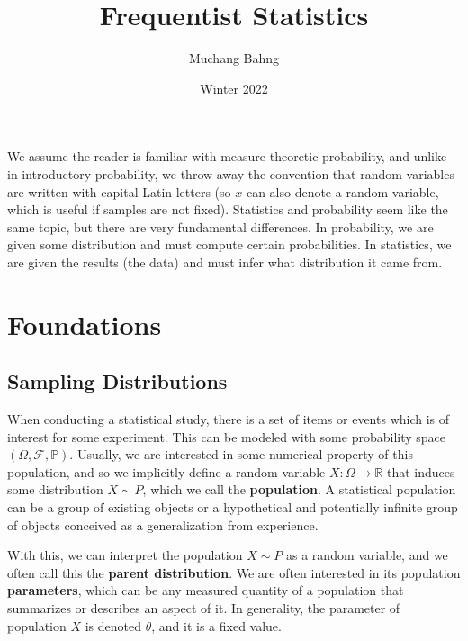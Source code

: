 \documentclass{article}
\begin{document}
\title{Frequentist Statistics}
\author{Muchang Bahng}
\date{Winter 2022}

\maketitle
\tableofcontents
\pagebreak

  We assume the reader is familiar with measure-theoretic probability, and unlike in introductory probability, we throw away the convention that random variables are written with capital Latin letters (so $x$ can also denote a random variable, which is useful if samples are not fixed). Statistics and probability seem like the same topic, but there are very fundamental differences. In probability, we are given some distribution and must compute certain probabilities. In statistics, we are given the results (the data) and must infer what distribution it came from. 

\section{Foundations}

  \subsection{Sampling Distributions}

    \begin{definition}
      When conducting a statistical study, there is a set of items or events which is of interest for some experiment. This can be modeled with some probability space $(\Omega, \mathcal{F}, \mathbb{P})$. Usually, we are interested in some numerical property of this population, and so we implicitly define a random variable $X: \Omega \longrightarrow \mathbb{R}$ that induces some distribution $X \sim P$, which we call the \textbf{population}. A statistical population can be a group of existing objects or a hypothetical and potentially infinite group of objects conceived as a generalization from experience. 

      With this, we can interpret the population $X \sim P$ as a random variable, and we often call this the \textbf{parent distribution}. We are often interested in its population \textbf{parameters}, which can be any measured quantity of a population that summarizes or describes an aspect of it. In generality, the parameter of population $X$ is denoted $\theta$, and it is a fixed value. 
    \end{definition} 
\end{document}
